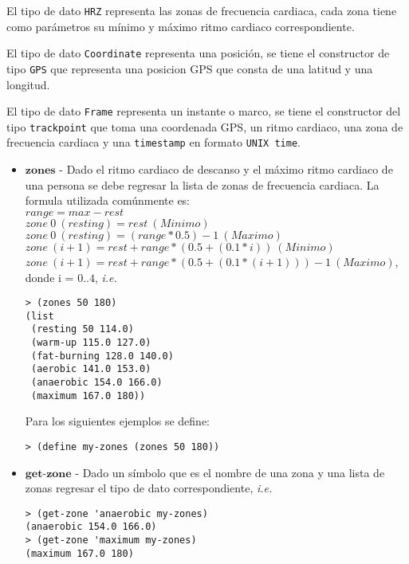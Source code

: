 \documentclass{article}
\begin{document}
El tipo de dato \verb;HRZ; representa las zonas de frecuencia cardiaca,
cada zona tiene como parámetros su mínimo y máximo ritmo cardiaco correspondiente.

El tipo de dato \verb;Coordinate; representa una posición, se tiene el constructor
de tipo \verb;GPS; que representa una posicion GPS que consta de una latitud y una longitud.

El tipo de dato \verb;Frame; representa un instante o marco, se tiene el constructor del tipo \verb;trackpoint; que toma una coordenada GPS, un ritmo cardiaco, una zona de frecuencia cardiaca y una \verb;timestamp; en formato \verb;UNIX time;.

\begin{itemize}
\item $\textbf{zones}$ - Dado el ritmo cardiaco de descanso y el máximo ritmo cardiaco de una persona se debe regresar la lista de zonas de frecuencia cardiaca. La formula utilizada comúnmente es:\\
  $range = max - rest$\\
  $zone\ 0\ (resting) = rest\ (Minimo)$\\
  $zone\ 0\ (resting) = (range * 0.5) - 1\ (Maximo)$\\

  $zone\ (i+1) = rest + range * (0.5 + (0.1 * i))\ (Minimo)$\\
  $zone\ (i+1) = rest + range * (0.5 + (0.1 * (i+1))) - 1\ (Maximo)$,\\
  donde i = $0..4$, \textit{i.e.}

\begin{verbatim}
> (zones 50 180)
(list
 (resting 50 114.0)
 (warm-up 115.0 127.0)
 (fat-burning 128.0 140.0)
 (aerobic 141.0 153.0)
 (anaerobic 154.0 166.0)
 (maximum 167.0 180))
\end{verbatim}

Para los siguientes ejemplos se define:
\begin{verbatim}
> (define my-zones (zones 50 180))
\end{verbatim}

\item $\textbf{get-zone}$ - Dado un símbolo que es el nombre de una zona y una lista de zonas regresar el tipo de dato correspondiente, \textit{i.e.}
\begin{verbatim}
> (get-zone 'anaerobic my-zones)
(anaerobic 154.0 166.0)
> (get-zone 'maximum my-zones)
(maximum 167.0 180)
\end{verbatim}


\end{itemize}
\end{document}

